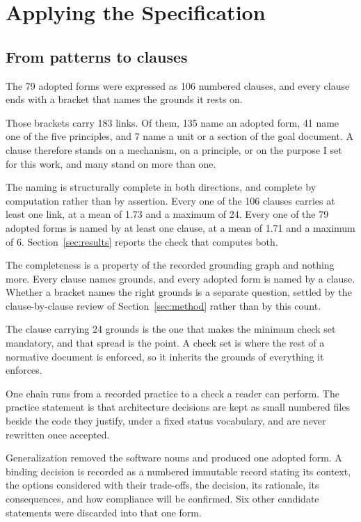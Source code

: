 \section{Applying the Specification}\label{sec:standard}

\subsection{From patterns to clauses}

The 79 adopted forms were expressed as 106 numbered clauses, and every clause ends with a bracket that names the grounds it rests on.

Those brackets carry 183 links. Of them, 135 name an adopted form, 41 name one of the five principles, and 7 name a unit or a section of the goal document. A clause therefore stands on a mechanism, on a principle, or on the purpose I set for this work, and many stand on more than one.

The naming is structurally complete in both directions, and complete by computation rather than by assertion. Every one of the 106 clauses carries at least one link, at a mean of 1.73 and a maximum of 24. Every one of the 79 adopted forms is named by at least one clause, at a mean of 1.71 and a maximum of 6. Section~\ref{sec:results} reports the check that computes both.

The completeness is a property of the recorded grounding graph and nothing more. Every clause names grounds, and every adopted form is named by a clause. Whether a bracket names the right grounds is a separate question, settled by the clause-by-clause review of Section~\ref{sec:method} rather than by this count.

The clause carrying 24 grounds is the one that makes the minimum check set mandatory, and that spread is the point. A check set is where the rest of a normative document is enforced, so it inherits the grounds of everything it enforces.

One chain runs from a recorded practice to a check a reader can perform. The practice statement is that architecture decisions are kept as small numbered files beside the code they justify, under a fixed status vocabulary, and are never rewritten once accepted.

Generalization removed the software nouns and produced one adopted form. A binding decision is recorded as a numbered immutable record stating its context, the options considered with their trade-offs, the decision, its rationale, its consequences, and how compliance will be confirmed. Six other candidate statements were discarded into that one form.

